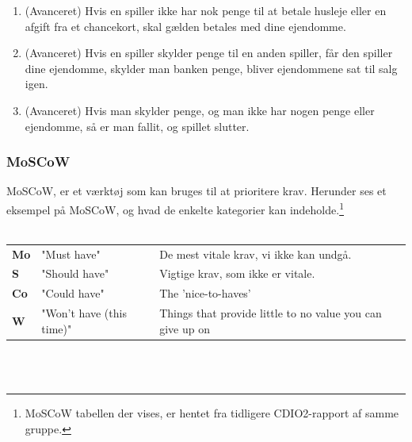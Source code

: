 \begin{enumerate}
\item (Avanceret) Hvis en spiller ikke har nok penge til at betale husleje eller en afgift fra et chancekort, skal gælden betales med dine ejendomme.
\item (Avanceret) Hvis en spiller skylder penge til en anden spiller, får den spiller dine ejendomme, skylder man banken penge, bliver ejendommene sat til salg igen.
\item (Avanceret) Hvis man skylder penge, og man ikke har nogen penge eller ejendomme, så er man fallit, og spillet slutter.\\
\end{enumerate}

\newpage

\subsubsection{MoSCoW}

MoSCoW, er et værktøj som kan bruges til at prioritere krav.
Herunder ses et eksempel på MoSCoW, og hvad de enkelte kategorier kan indeholde.\footnote{MoSCoW tabellen der vises, er hentet fra tidligere CDIO2-rapport af samme gruppe.} \\\\

\begin{tabular}{lll}
    \textbf{Mo} &   
    "Must have"                 &
    De mest vitale krav, vi ikke kan undgå. \\

    \textbf{S}  &   
    "Should have"               & 
    Vigtige krav, som ikke er vitale. \\

    \textbf{Co} &   
    "Could have"                & 
    The 'nice-to-haves' \\

    \textbf{W}  &   
    "Won’t have (this time)"    & 
    Things that provide little to no value you can give up on \\

\end{tabular}
\\\\

